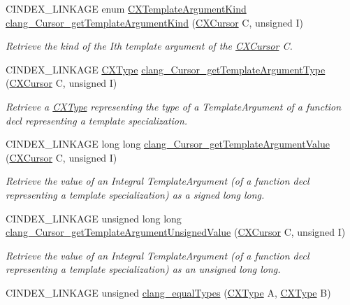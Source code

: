 \begin{DoxyCompactItemize}
C\+I\+N\+D\+E\+X\+\_\+\+L\+I\+N\+K\+A\+GE enum \hyperlink{group__CINDEX__TYPES_gaf23c39e68c1fc756643583b43ee3e494}{C\+X\+Template\+Argument\+Kind} \hyperlink{group__CINDEX__TYPES_gad657c21f57e009899bd6a0ab618ee321}{clang\+\_\+\+Cursor\+\_\+get\+Template\+Argument\+Kind} (\hyperlink{structCXCursor}{C\+X\+Cursor} C, unsigned I)
\begin{DoxyCompactList}\small\item\em Retrieve the kind of the I\textquotesingle{}th template argument of the \hyperlink{structCXCursor}{C\+X\+Cursor} C. \end{DoxyCompactList}\item 
C\+I\+N\+D\+E\+X\+\_\+\+L\+I\+N\+K\+A\+GE \hyperlink{structCXType}{C\+X\+Type} \hyperlink{group__CINDEX__TYPES_gae3fab0d8906e4531a1b7fbe77b4b4bc1}{clang\+\_\+\+Cursor\+\_\+get\+Template\+Argument\+Type} (\hyperlink{structCXCursor}{C\+X\+Cursor} C, unsigned I)
\begin{DoxyCompactList}\small\item\em Retrieve a \hyperlink{structCXType}{C\+X\+Type} representing the type of a Template\+Argument of a function decl representing a template specialization. \end{DoxyCompactList}\item 
C\+I\+N\+D\+E\+X\+\_\+\+L\+I\+N\+K\+A\+GE long long \hyperlink{group__CINDEX__TYPES_ga46e363545effaa0794a2ba4bcfae1fe3}{clang\+\_\+\+Cursor\+\_\+get\+Template\+Argument\+Value} (\hyperlink{structCXCursor}{C\+X\+Cursor} C, unsigned I)
\begin{DoxyCompactList}\small\item\em Retrieve the value of an Integral Template\+Argument (of a function decl representing a template specialization) as a signed long long. \end{DoxyCompactList}\item 
C\+I\+N\+D\+E\+X\+\_\+\+L\+I\+N\+K\+A\+GE unsigned long long \hyperlink{group__CINDEX__TYPES_ga08dac49044448c022457224e73223eb2}{clang\+\_\+\+Cursor\+\_\+get\+Template\+Argument\+Unsigned\+Value} (\hyperlink{structCXCursor}{C\+X\+Cursor} C, unsigned I)
\begin{DoxyCompactList}\small\item\em Retrieve the value of an Integral Template\+Argument (of a function decl representing a template specialization) as an unsigned long long. \end{DoxyCompactList}\item 
C\+I\+N\+D\+E\+X\+\_\+\+L\+I\+N\+K\+A\+GE unsigned \hyperlink{group__CINDEX__TYPES_gac047de2ab0f7e1b1586d8317a658a1d9}{clang\+\_\+equal\+Types} (\hyperlink{structCXType}{C\+X\+Type} A, \hyperlink{structCXType}{C\+X\+Type} B)

\end{DoxyCompactItemize}
